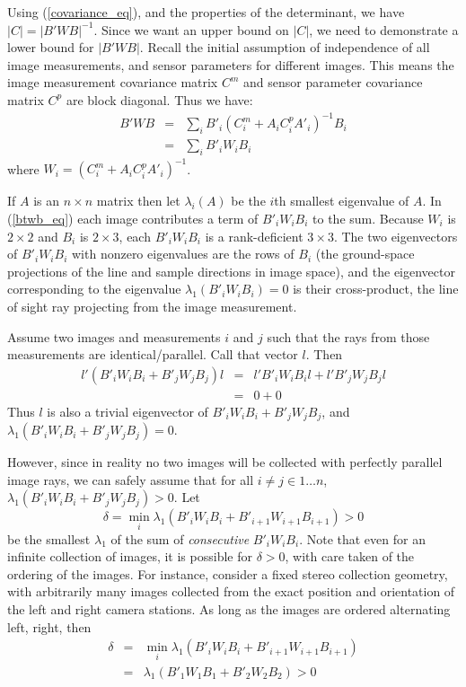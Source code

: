 \documentclass[10pt]{amsart}
\newcommand{\btwbi}{B'_iW_iB_i}
\newcommand{\btwbii}{B'_{i+1}W_{i+1}B_{i+1}}
\newcommand{\btwbj}{B'_jW_jB_j}
\newcommand{\btwbone}{B'_1W_1B_1}
\newcommand{\btwbtwo}{B'_2W_2B_2}
\begin{document}
Using (\ref{covariance_eq}), and the properties of the determinant, we have $|C|
= |B'WB|^{-1}$. Since we want an upper bound on $|C|$, we need to demonstrate a
lower bound for $|B'WB|$. Recall the initial assumption of independence of all
image measurements, and sensor parameters for different images.  This means the image
measurement covariance matrix $C^m$ and sensor parameter covariance matrix $C^p$
are block diagonal. Thus we have:
\begin{eqnarray}\label{btwb_eq}
B'WB & = & \sum_{i}B'_i(C^m_i + A_iC^p_iA'_i)^{-1}B_i \nonumber \\
     & = & \sum_{i}\btwbi
\end{eqnarray}
%
where $W_i = (C^m_i + A_iC^p_iA'_i)^{-1}$.

If $A$ is an $n\times n$ matrix then let $\lambda_i(A)$ be the $i$th smallest
eigenvalue of $A$.  In (\ref{btwb_eq}) each image contributes a term of $\btwbi$
to the sum. Because $W_i$ is $2\times 2$ and $B_i$ is $2\times 3$, each $\btwbi$
is a rank-deficient $3\times 3$. The two eigenvectors of $\btwbi$ with nonzero
eigenvalues are the rows of $B_i$ (the ground-space projections of the line and
sample directions in image space), and the eigenvector corresponding to the
eigenvalue $\lambda_1(\btwbi)=0$ is their cross-product, the line of sight ray
projecting from the image measurement.

Assume two images and measurements $i$ and $j$ such that the rays from those
measurements are identical/parallel. Call that vector $l$. Then
%
\begin{eqnarray*}
l'(\btwbi+\btwbj)l & = & l'\btwbi l + l'\btwbj l \\
                   & = & 0 + 0
\end{eqnarray*}
Thus $l$ is also a trivial eigenvector of $\btwbi+\btwbj$, and $\lambda_1(\btwbi+\btwbj)=0$.

However, since in reality no two images will be collected with perfectly
parallel image rays, we can safely assume that for all $i\ne j\in1\ldots n$, 
$\lambda_1(\btwbi+\btwbj)>0$. Let 
\begin{equation}\label{w_assumption_eq}
\delta = \min_{i}\lambda_1(\btwbi+\btwbii) > 0
\end{equation}
be the smallest $\lambda_1$ of the sum of {\em consecutive} $\btwbi$. Note that
even for an infinite collection of images, it is possible for $\delta>0$, with
care taken of the ordering of the images. For instance, consider a fixed stereo
collection geometry, with arbitrarily many images collected from the exact
position and orientation of the left and right camera stations. As long as the
images are ordered alternating left, right, then
\begin{eqnarray*}
\delta&=&\min_{i}\lambda_1(\btwbi+\btwbii)\\
      &=&\lambda_1(\btwbone+\btwbtwo)>0
\end{eqnarray*}
\end{document}
